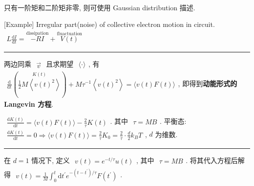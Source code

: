 \documentclass[../../main.tex]{subfiles}
\begin{document}
只有一阶矩和二阶矩非零, 则可使用 Gaussian distribution 描述.

[Example] Irregular part(noise) of collective electron motion in circuit. $\begin{aligned}
    L\frac{\mathrm{d}I}{\mathrm{d}t} = \stackrel{\text{dissipation}}{-RI} + \stackrel{\text{fluactuation}}{V(t)}
\end{aligned}$

\vspace{0.5em}\hrule\vspace{0.5em}

两边同乘 $\begin{aligned}
    \vec{v}
\end{aligned}$ 且求期望 $\begin{aligned}
    \langle\cdot\rangle
\end{aligned}$, 有 $\begin{aligned}
    \frac{\mathrm{d}}{\mathrm{d}t}\left(\stackrel{K(t)}{\frac{1}{2}M\left\langle v(t)^{2}\right\rangle}\right) 
    + M\tau^{-1}\left\langle v(t)^{2}\right\rangle 
    = \langle v(t)F(t)\rangle
\end{aligned}$, 即得到\textbf{动能形式的 Langevin 方程}. 

$\begin{aligned}
    \frac{\mathrm{d}K(t)}{\mathrm{d}t} 
    = \langle v(t)F(t)\rangle - \frac{2}{\tau}K(t)
\end{aligned}$. 其中 $\begin{aligned}
    \tau = MB
\end{aligned}$. 平衡态: $\begin{aligned}
    \frac{\mathrm{d}K(t)}{\mathrm{d}t} = 0\Rightarrow \langle v(t)F(t)\rangle = \frac{2}{\tau}K_{0} = \frac{2}{\tau}\cdot\frac{d}{2}k_{B}T
\end{aligned}$, $d$ 为维数.

\vspace{0.5em}\hrule\vspace{0.5em}

在 $d=1$ 情况下, 定义 $\begin{aligned}
    v(t) = e^{-t/\tau}u(t)
\end{aligned}$, 其中 $\begin{aligned}
    \tau = MB
\end{aligned}$. 将其代入方程后解得 $\begin{aligned}
    \boxed{v(t) = \frac{1}{M}\int_{0}^{t}\mathrm{d}t^{\prime}e^{-\left(t-t^{\prime}\right)/\tau}F\left(t^{\prime}\right)}
\end{aligned}$. 
\end{document}
